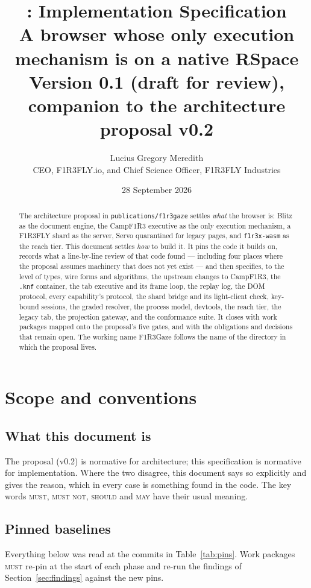 \documentclass[11pt]{article}
\title{\textbf{\Gz{}: Implementation Specification}\\[4pt]
\large A browser whose only execution mechanism is \fl{} on a native RSpace\\[6pt]
\normalsize Version 0.1 (draft for review), companion to the architecture proposal v0.2}
\author{Lucius Gregory Meredith\\
\small CEO, F1R3FLY.io, and Chief Science Officer, F1R3FLY Industries}
\date{28 September 2026}
\theoremstyle{definition}
\theoremstyle{remark}
\newcommand{\Camp}{CampF1R3}
\newcommand{\MUST}{\textsc{must}}
\newcommand{\MUSTNOT}{\textsc{must not}}
\newcommand{\SHOULD}{\textsc{should}}
\newcommand{\MAY}{\textsc{may}}
\newcommand{\code}[1]{\texttt{#1}}
\newcommand{\Gz}{F1R3Gaze}
\begin{document}
\maketitle

\begin{abstract}
\noindent
The architecture proposal in \code{publications/f1r3gaze} settles \emph{what} the
browser is: Blitz as the document engine, the \Camp{} executive as the only
execution mechanism, a F1R3FLY shard as the server, Servo quarantined for legacy
pages, and \code{f1r3x-wasm} as the reach tier. This document settles \emph{how}
to build it. It pins the code it builds on, records what a line-by-line review of
that code found --- including four places where the proposal assumes machinery
that does not yet exist --- and then specifies, to the level of types, wire forms
and algorithms, the upstream changes to \Camp{}, the \code{.knf} container, the
tab executive and its frame loop, the replay log, the DOM protocol, every
capability's protocol, the shard bridge and its light-client check, key-bound
sessions, the graded resolver, the process model, devtools, the reach tier, the
legacy tab, the projection gateway, and the conformance suite. It closes with work
packages mapped onto the proposal's five gates, and with the obligations and
decisions that remain open. The working name \Gz{} follows the name of the
directory in which the proposal lives.
\end{abstract}

\tableofcontents

\section{Scope and conventions}\label{sec:scope}

\subsection{What this document is}
The proposal (v0.2) is normative for architecture; this specification is normative
for implementation. Where the two disagree, this document says so explicitly and
gives the reason, which in every case is something found in the code. The key words
\MUST{}, \MUSTNOT{}, \SHOULD{} and \MAY{} have their usual meaning.

\subsection{Pinned baselines}
Everything below was read at the commits in Table~\ref{tab:pins}. Work packages
\MUST{} re-pin at the start of each phase and re-run the findings of
Section~\ref{sec:findings} against the new pins.
\end{document}
